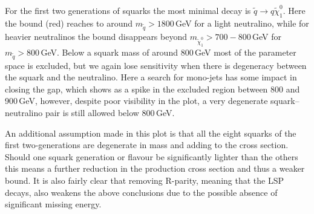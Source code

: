 \documentclass[notes.tex]{subfiles}
\begin{document}
For the first two generations of squarks the most minimal decay is $\tilde q\to q\tilde\chi_1^0$. Here the bound (red) reaches to around $m_{\tilde q}>1800$\,GeV for a light neutralino, while for heavier neutralinos the bound disappears beyond $m_{\tilde{\chi}_1^0}>700-800$\,GeV for $m_{\tilde q}>800$\,GeV. Below a squark mass of around 800\,GeV most of the parameter space is excluded, but we again lose sensitivity when there is degeneracy between the squark and the neutralino. Here a search for mono-jets has some impact in closing the gap, which shows as a spike in the excluded region between 800 and 900\,GeV, however, despite poor visibility in the plot, a very degenerate squark--neutralino pair is still allowed below 800\,GeV. 

An additional assumption made in this plot is that all the eight squarks of the first two-generations are degenerate in mass and adding to the cross section. Should one squark generation or flavour be significantly lighter than the others this means a further reduction in the production cross section and thus a weaker bound. It is also fairly clear that removing R-parity, meaning that the LSP decays, also weakens the above conclusions due to the possible absence of significant missing energy. 


%
\end{document}
